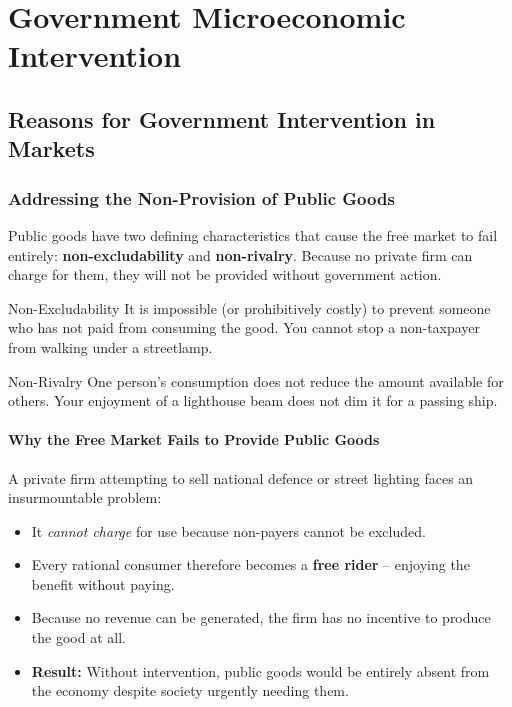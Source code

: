 \documentclass[11pt, a4paper, twoside]{book}
\begin{document}
\chapter{Government Microeconomic Intervention}

\section{Reasons for Government Intervention in Markets}

\subsection{Addressing the Non-Provision of Public Goods}

\begin{coreidea}
Public goods have two defining characteristics that cause the free market to fail entirely: \textbf{non-excludability} and \textbf{non-rivalry}. Because no private firm can charge for them, they will not be provided without government action.
\end{coreidea}

\begin{keyterm}{Non-Excludability}
It is impossible (or prohibitively costly) to prevent someone who has not paid from consuming the good. You cannot stop a non-taxpayer from walking under a streetlamp.
\end{keyterm}

\begin{keyterm}{Non-Rivalry}
One person's consumption does not reduce the amount available for others. Your enjoyment of a lighthouse beam does not dim it for a passing ship.
\end{keyterm}

\subsubsection{Why the Free Market Fails to Provide Public Goods}

A private firm attempting to sell national defence or street lighting faces an insurmountable problem:
\begin{itemize}
  \item It \emph{cannot charge} for use because non-payers cannot be excluded.
  \item Every rational consumer therefore becomes a \textbf{free rider} -- enjoying the benefit without paying.
  \item Because no revenue can be generated, the firm has no incentive to produce the good at all.
  \item \textbf{Result:} Without intervention, public goods would be entirely absent from the economy despite society urgently needing them.
\end{itemize}
\end{document}
